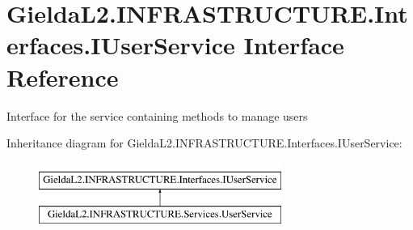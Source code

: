 \hypertarget{interface_gielda_l2_1_1_i_n_f_r_a_s_t_r_u_c_t_u_r_e_1_1_interfaces_1_1_i_user_service}{}\section{Gielda\+L2.\+I\+N\+F\+R\+A\+S\+T\+R\+U\+C\+T\+U\+R\+E.\+Interfaces.\+I\+User\+Service Interface Reference}
\label{interface_gielda_l2_1_1_i_n_f_r_a_s_t_r_u_c_t_u_r_e_1_1_interfaces_1_1_i_user_service}


Interface for the service containing methods to manage users  


Inheritance diagram for Gielda\+L2.\+I\+N\+F\+R\+A\+S\+T\+R\+U\+C\+T\+U\+R\+E.\+Interfaces.\+I\+User\+Service\+:\begin{figure}[H]
\begin{center}
\leavevmode
\includegraphics[height=2.000000cm]{interface_gielda_l2_1_1_i_n_f_r_a_s_t_r_u_c_t_u_r_e_1_1_interfaces_1_1_i_user_service}
\end{center}
\end{figure}
